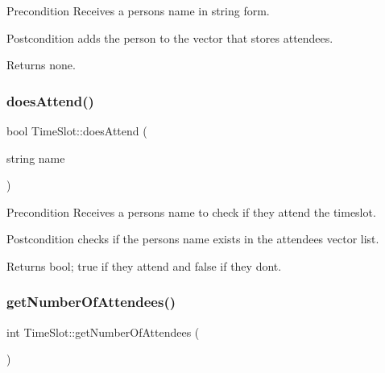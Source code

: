 \begin{DoxyPrecond}{Precondition}
Receives a person\textquotesingle{}s name in string form. 
\end{DoxyPrecond}
\begin{DoxyPostcond}{Postcondition}
adds the person to the vector that stores attendees. 
\end{DoxyPostcond}
\begin{DoxyReturn}{Returns}
none. 
\end{DoxyReturn}
\mbox{\label{class_time_slot_ab2b56bf1b3d0405e6ba66500667f83fc}} 
\subsubsection{\texorpdfstring{does\+Attend()}{doesAttend()}}
{\footnotesize\ttfamily bool Time\+Slot\+::does\+Attend (\begin{DoxyParamCaption}\item[{string}]{name }\end{DoxyParamCaption})}

\begin{DoxyPrecond}{Precondition}
Receives a person\textquotesingle{}s name to check if they attend the timeslot. 
\end{DoxyPrecond}
\begin{DoxyPostcond}{Postcondition}
checks if the person\textquotesingle{}s name exists in the attendees vector list. 
\end{DoxyPostcond}
\begin{DoxyReturn}{Returns}
bool; true if they attend and false if they don\textquotesingle{}t. 
\end{DoxyReturn}
\mbox{\label{class_time_slot_adfc2838008fa5f52a2f006187764ed3c}} 
\subsubsection{\texorpdfstring{get\+Number\+Of\+Attendees()}{getNumberOfAttendees()}}
{\footnotesize\ttfamily int Time\+Slot\+::get\+Number\+Of\+Attendees (\begin{DoxyParamCaption}{ }\end{DoxyParamCaption})}

